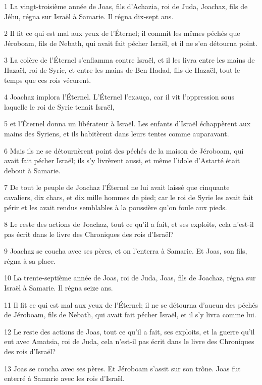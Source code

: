 \par 1 La vingt-troisième année de Joas, fils d'Achazia, roi de Juda, Joachaz, fils de Jéhu, régna sur Israël à Samarie. Il régna dix-sept ans.
\par 2 Il fit ce qui est mal aux yeux de l'Éternel; il commit les mêmes péchés que Jéroboam, fils de Nebath, qui avait fait pécher Israël, et il ne s'en détourna point.
\par 3 La colère de l'Éternel s'enflamma contre Israël, et il les livra entre les mains de Hazaël, roi de Syrie, et entre les mains de Ben Hadad, fils de Hazaël, tout le temps que ces rois vécurent.
\par 4 Joachaz implora l'Éternel. L'Éternel l'exauça, car il vit l'oppression sous laquelle le roi de Syrie tenait Israël,
\par 5 et l'Éternel donna un libérateur à Israël. Les enfants d'Israël échappèrent aux mains des Syriens, et ils habitèrent dans leurs tentes comme auparavant.
\par 6 Mais ils ne se détournèrent point des péchés de la maison de Jéroboam, qui avait fait pécher Israël; ils s'y livrèrent aussi, et même l'idole d'Astarté était debout à Samarie.
\par 7 De tout le peuple de Joachaz l'Éternel ne lui avait laissé que cinquante cavaliers, dix chars, et dix mille hommes de pied; car le roi de Syrie les avait fait périr et les avait rendus semblables à la poussière qu'on foule aux pieds.
\par 8 Le reste des actions de Joachaz, tout ce qu'il a fait, et ses exploits, cela n'est-il pas écrit dans le livre des Chroniques des rois d'Israël?
\par 9 Joachaz se coucha avec ses pères, et on l'enterra à Samarie. Et Joas, son fils, régna à sa place.
\par 10 La trente-septième année de Joas, roi de Juda, Joas, fils de Joachaz, régna sur Israël à Samarie. Il régna seize ans.
\par 11 Il fit ce qui est mal aux yeux de l'Éternel; il ne se détourna d'aucun des péchés de Jéroboam, fils de Nebath, qui avait fait pécher Israël, et il s'y livra comme lui.
\par 12 Le reste des actions de Joas, tout ce qu'il a fait, ses exploits, et la guerre qu'il eut avec Amatsia, roi de Juda, cela n'est-il pas écrit dans le livre des Chroniques des rois d'Israël?
\par 13 Joas se coucha avec ses pères. Et Jéroboam s'assit sur son trône. Joas fut enterré à Samarie avec les rois d'Israël.
